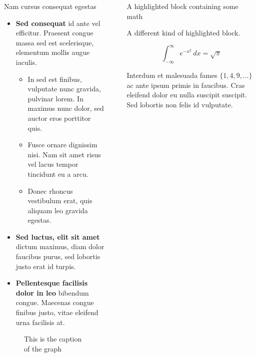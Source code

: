 \documentclass[final]{beamer}
\newlength{\sepwidth}
\newlength{\colwidth}
\newcommand{\separatorcolumn}{\begin{column}{\sepwidth}\end{column}}
\begin{document}
\begin{frame}[t]
\begin{columns}[t]
\begin{column}{\colwidth}
\begin{block}{Nam cursus consequat egestas}
    \begin{itemize}
      \item \textbf{Sed consequat} id ante vel efficitur. Praesent congue massa
        sed est scelerisque, elementum mollis augue iaculis.
        \begin{itemize}
          \item In sed est finibus, vulputate
            nunc gravida, pulvinar lorem. In maximus nunc dolor, sed auctor eros
            porttitor quis.
          \item Fusce ornare dignissim nisi. Nam sit amet risus vel lacus
            tempor tincidunt eu a arcu.
          \item Donec rhoncus vestibulum erat, quis aliquam leo
            gravida egestas.
        \end{itemize}
      \item \textbf{Sed luctus, elit sit amet} dictum maximus, diam dolor
        faucibus purus, sed lobortis justo erat id turpis.
      \item \textbf{Pellentesque facilisis dolor in leo} bibendum congue.
        Maecenas congue finibus justo, vitae eleifend urna facilisis at.
    \end{itemize}
    
\begin{figure}[htbp]
    \centering

    \resizebox{\textwidth}{!}{
    
    }
    
    \caption{This is the caption of the graph}
    \label{fig:mygraph}
\end{figure}


  \end{block}

\end{column}

\separatorcolumn

\begin{column}{\colwidth}

  \begin{exampleblock}{A highlighted block containing some math}

    A different kind of highlighted block.

    $$
    \int_{-\infty}^{\infty} e^{-x^2}\,dx = \sqrt{\pi}
    $$

    Interdum et malesuada fames $\{1, 4, 9, \ldots\}$ ac ante ipsum primis in
    faucibus. Cras eleifend dolor eu nulla suscipit suscipit. Sed lobortis non
    felis id vulputate.


\end{exampleblock}
\end{column}
\end{columns}
\end{frame}
\end{document}
